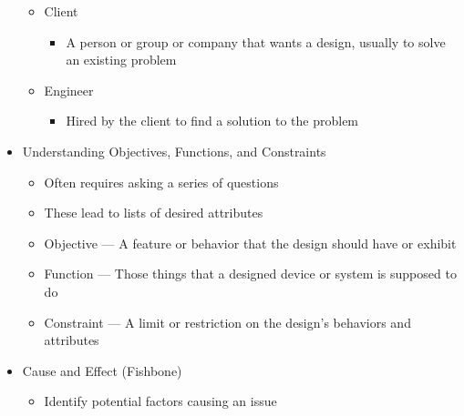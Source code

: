 \begin{itemize}
\begin{itemize}
      \item Client

        \begin{itemize}

          \item A person or group or company that wants a design, usually to solve an existing problem

        \end{itemize}

      \item Engineer

        \begin{itemize}

          \item Hired by the client to find a solution to the problem

        \end{itemize}

    \end{itemize}

  \item Understanding Objectives, Functions, and Constraints

    \begin{itemize}

      \item Often requires asking a series of questions

      \item These lead to lists of desired attributes

      \item Objective — A feature or behavior that the design should have or exhibit

      \item Function — Those things that a designed device or system is supposed to do

      \item Constraint — A limit or restriction on the design's behaviors and attributes

    \end{itemize}

  \item Cause and Effect (Fishbone)

    \begin{itemize}

      \item Identify potential factors causing an issue

    \end{itemize}


\end{itemize}
